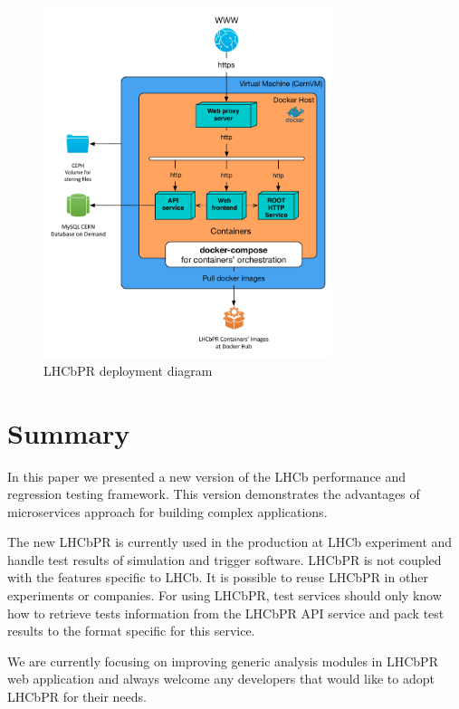 \documentclass[a4paper]{jpconf}
\begin{document}
\begin{figure}[H]
\begin{minipage}{\textwidth}
\includegraphics[width=0.75\textwidth]{figs/lhcbpr-nodes.pdf}
\caption{\label{fig:nodes}LHCbPR deployment diagram}
\end{minipage}
\end{figure}

\section{Summary}
In this paper we presented a new version of the LHCb performance and regression
testing framework. This version demonstrates the advantages of microservices
approach for building complex applications.

The new LHCbPR is currently used in the production at LHCb experiment and handle
test results of simulation and trigger software. LHCbPR is not coupled with the
features specific to LHCb. It is possible to reuse LHCbPR in other experiments
or companies. For using LHCbPR, test services should only know how to retrieve
tests information from the LHCbPR API service and pack test results to the
format specific for this service.

We are currently focusing on improving generic analysis modules in LHCbPR web
application and always welcome any developers that would like to adopt LHCbPR
for their needs.
\end{document}
